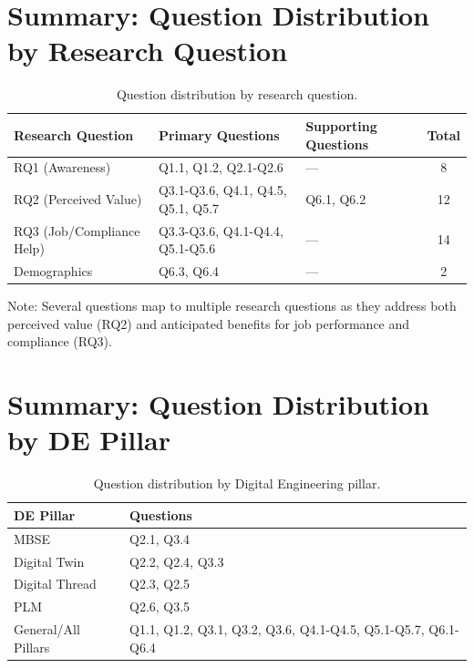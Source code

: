   \section{Summary: Question Distribution by Research Question}

  \begin{table}[H]
    \centering
    \caption{Question distribution by research question.}
    \label{tab:question-distribution-rq}
    \begin{tabular}{@{}lp{2in}p{1.2in}c@{}}
      \toprule
      \textbf{Research Question} & \textbf{Primary Questions} & \textbf{Supporting Questions} & \textbf{Total} \\
      \midrule
      RQ1 (Awareness) & Q1.1, Q1.2, Q2.1-Q2.6 & --- & 8 \\
      RQ2 (Perceived Value) & Q3.1-Q3.6, Q4.1, Q4.5, Q5.1, Q5.7 & Q6.1, Q6.2 & 12 \\
      RQ3 (Job/Compliance Help) & Q3.3-Q3.6, Q4.1-Q4.4, Q5.1-Q5.6 & --- & 14 \\
      Demographics & Q6.3, Q6.4 & --- & 2 \\
      \bottomrule
    \end{tabular}
  \end{table}

  Note: Several questions map to multiple research questions as they address both perceived value (RQ2) and anticipated benefits for job performance and compliance (RQ3).

  \section{Summary: Question Distribution by DE Pillar}

  \begin{table}[H]
    \centering
    \caption{Question distribution by Digital Engineering pillar.}
    \label{tab:question-distribution-pillar}
    \begin{tabular}{@{}lp{4in}@{}}
      \toprule
      \textbf{DE Pillar} & \textbf{Questions} \\
      \midrule
      MBSE & Q2.1, Q3.4 \\
      Digital Twin & Q2.2, Q2.4, Q3.3 \\
      Digital Thread & Q2.3, Q2.5 \\
      PLM & Q2.6, Q3.5 \\
      General/All Pillars & Q1.1, Q1.2, Q3.1, Q3.2, Q3.6, Q4.1-Q4.5, Q5.1-Q5.7, Q6.1-Q6.4 \\
      \bottomrule
    \end{tabular}
  \end{table}

